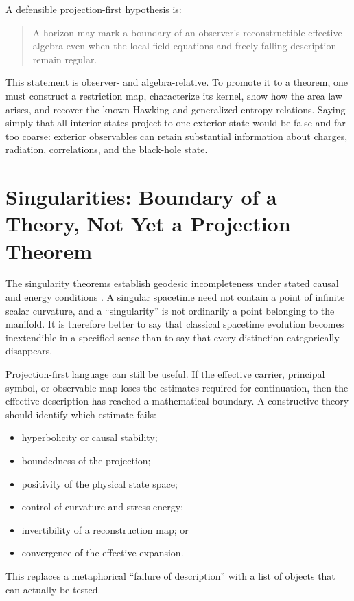 \documentclass[11pt]{article}
\begin{document}
A defensible projection-first hypothesis is:
\begin{quote}
A horizon may mark a boundary of an observer's reconstructible effective
algebra even when the local field equations and freely falling description
remain regular.
\end{quote}
This statement is observer- and algebra-relative.  To promote it to a theorem,
one must construct a restriction map, characterize its kernel, show how the
area law arises, and recover the known Hawking and generalized-entropy
relations.  Saying simply that all interior states project to one exterior
state would be false and far too coarse: exterior observables can retain
substantial information about charges, radiation, correlations, and the
black-hole state.

\section{Singularities: Boundary of a Theory, Not Yet a Projection Theorem}

The singularity theorems establish geodesic incompleteness under stated
causal and energy conditions \cite{HawkingPenrose}.  A singular spacetime need
not contain a point of infinite scalar curvature, and a ``singularity'' is
not ordinarily a point belonging to the manifold.  It is therefore better to
say that classical spacetime evolution becomes inextendible in a specified
sense than to say that every distinction categorically disappears.

Projection-first language can still be useful.  If the effective carrier,
principal symbol, or observable map loses the estimates required for
continuation, then the effective description has reached a mathematical
boundary.  A constructive theory should identify which estimate fails:
\begin{itemize}
\item hyperbolicity or causal stability;
\item boundedness of the projection;
\item positivity of the physical state space;
\item control of curvature and stress-energy;
\item invertibility of a reconstruction map; or
\item convergence of the effective expansion.
\end{itemize}
This replaces a metaphorical ``failure of description'' with a list of
objects that can actually be tested.
\end{document}
